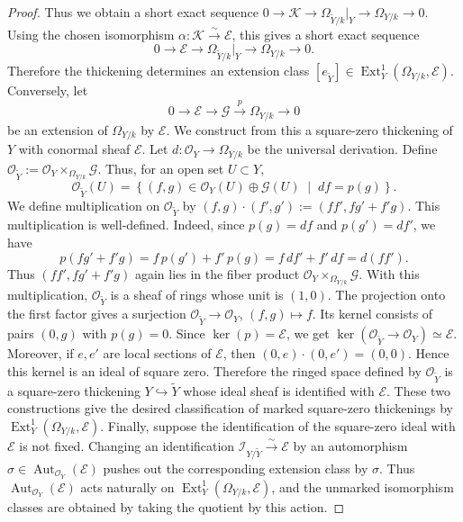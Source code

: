 \documentclass[11pt,twoside]{amsart}
\theoremstyle{plain}
\numberwithin{equation}{section}
\theoremstyle{definition}
\begin{document}
\begin{proof}
Thus we obtain a short exact sequence
\(0\to\mathcal K\to\Omega_{\widetilde Y/k}|_Y\to\Omega_{Y/k}\to 0\).
Using the chosen isomorphism \(\alpha:\mathcal K\xrightarrow{\sim}\mathcal E\),
this gives a short exact sequence
\[
    0
    \longrightarrow
    \mathcal E
    \longrightarrow
    \Omega_{\widetilde Y/k}|_Y
    \longrightarrow
    \Omega_{Y/k}
    \longrightarrow 0.
\]
Therefore the thickening determines an extension class
\([e_{\widetilde Y}]\in\operatorname{Ext}^{1}_{Y}(\Omega_{Y/k},\mathcal E)\). Conversely, let
\[
    0
    \longrightarrow
    \mathcal E
    \longrightarrow
    \mathcal G
    \xrightarrow{p}
    \Omega_{Y/k}
    \longrightarrow 0
\]
be an extension of \(\Omega_{Y/k}\) by \(\mathcal E\). We construct from this a
square-zero thickening of \(Y\) with conormal sheaf \(\mathcal E\). Let \(d:\mathcal O_Y\to\Omega_{Y/k}\) be the universal derivation. Define
\(\mathcal O_{\widetilde Y}:=\mathcal O_Y\times_{\Omega_{Y/k}}\mathcal G\).
Thus, for an open set \(U\subset Y\),
\[
    \mathcal O_{\widetilde Y}(U)
    =
    \left\{
        (f,g)\in \mathcal O_Y(U)\oplus\mathcal G(U)
        \;\middle|\;
        df=p(g)
    \right\}.
\]
We define multiplication on \(\mathcal O_{\widetilde Y}\) by
\((f,g)\cdot(f',g'):=(ff',fg'+f'g)\).
This multiplication is well-defined. Indeed, since \(p(g)=df\) and \(p(g')=df'\), we have
\[
    p(fg'+f'g)
    =
    f\,p(g')+f'\,p(g)
    =
    f\,df'+f'\,df
    =
    d(ff').
\]
Thus \((ff',fg'+f'g)\) again lies in the fiber product
\(\mathcal O_Y\times_{\Omega_{Y/k}}\mathcal G\). With this multiplication,
\(\mathcal O_{\widetilde Y}\) is a sheaf of rings whose unit is \((1,0)\).
The projection onto the first factor gives a surjection
\(\mathcal O_{\widetilde Y}\to\mathcal O_Y\), \((f,g)\mapsto f\). Its kernel consists of pairs \((0,g)\) with \(p(g)=0\). Since \(\ker(p)=\mathcal E\), we get
\(\ker(\mathcal O_{\widetilde Y}\to\mathcal O_Y)\simeq\mathcal E\).
Moreover, if \(e,e'\) are local sections of \(\mathcal E\), then
\((0,e)\cdot(0,e')=(0,0)\). Hence this kernel is an ideal of square zero. Therefore the ringed space defined by \(\mathcal O_{\widetilde Y}\) is a square-zero
thickening \(Y\hookrightarrow \widetilde Y\) whose ideal sheaf is identified with
\(\mathcal E\). These two constructions give the desired classification of marked square-zero thickenings by \(\operatorname{Ext}^{1}_{Y}(\Omega_{Y/k},\mathcal E)\). Finally, suppose the identification of the square-zero ideal with \(\mathcal E\) is not fixed.
Changing an identification \(\mathcal I_{Y/\widetilde Y}\xrightarrow{\sim}\mathcal E\) by an automorphism \(\sigma\in \operatorname{Aut}_{\mathcal O_Y}(\mathcal E)\) pushes out the corresponding extension class by \(\sigma\). Thus
\(\operatorname{Aut}_{\mathcal O_Y}(\mathcal E)\) acts naturally on
\(\operatorname{Ext}^{1}_{Y}(\Omega_{Y/k},\mathcal E)\), and the unmarked isomorphism classes are obtained by taking the quotient by this action.
\end{proof}
\end{document}
